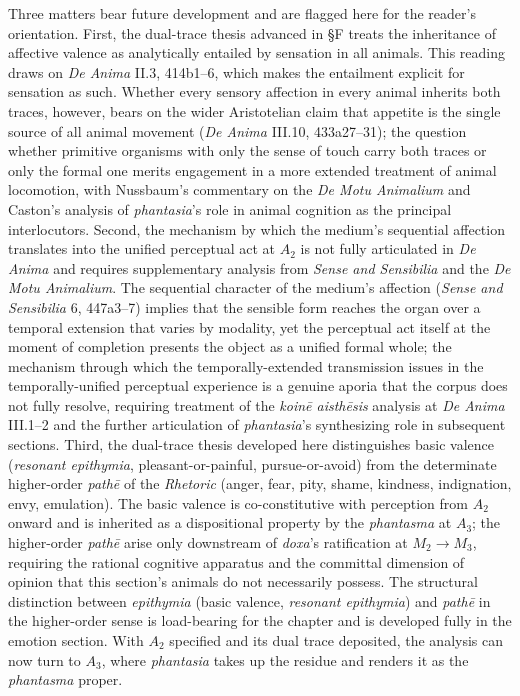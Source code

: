 Three matters bear future development and are flagged here for the reader's orientation. First, the dual-trace thesis advanced in §F treats the inheritance of affective valence as analytically entailed by sensation in all animals. This reading draws on \textit{De Anima} II.3, 414b1--6, which makes the entailment explicit for sensation as such. Whether every sensory affection in every animal inherits both traces, however, bears on the wider Aristotelian claim that appetite is the single source of all animal movement (\textit{De Anima} III.10, 433a27--31); the question whether primitive organisms with only the sense of touch carry both traces or only the formal one merits engagement in a more extended treatment of animal locomotion, with Nussbaum's commentary on the \textit{De Motu Animalium} and Caston's analysis of \textit{phantasia}'s role in animal cognition as the principal interlocutors. Second, the mechanism by which the medium's sequential affection translates into the unified perceptual act at $A_2$ is not fully articulated in \textit{De Anima} and requires supplementary analysis from \textit{Sense and Sensibilia} and the \textit{De Motu Animalium}. The sequential character of the medium's affection (\textit{Sense and Sensibilia} 6, 447a3--7) implies that the sensible form reaches the organ over a temporal extension that varies by modality, yet the perceptual act itself at the moment of completion presents the object as a unified formal whole; the mechanism through which the temporally-extended transmission issues in the temporally-unified perceptual experience is a genuine aporia that the corpus does not fully resolve, requiring treatment of the \textit{koinē aisthēsis} analysis at \textit{De Anima} III.1--2 and the further articulation of \textit{phantasia}'s synthesizing role in subsequent sections. Third, the dual-trace thesis developed here distinguishes basic valence (\textit{resonant epithymia}, pleasant-or-painful, pursue-or-avoid) from the determinate higher-order \textit{pathē} of the \textit{Rhetoric} (anger, fear, pity, shame, kindness, indignation, envy, emulation). The basic valence is co-constitutive with perception from $A_2$ onward and is inherited as a dispositional property by the \textit{phantasma} at $A_3$; the higher-order \textit{pathē} arise only downstream of \textit{doxa}'s ratification at $M_2 \rightarrow M_3$, requiring the rational cognitive apparatus and the committal dimension of opinion that this section's animals do not necessarily possess. The structural distinction between \textit{epithymia} (basic valence, \textit{resonant epithymia}) and \textit{pathē} in the higher-order sense is load-bearing for the chapter and is developed fully in the emotion section. With $A_2$ specified and its dual trace deposited, the analysis can now turn to $A_3$, where \textit{phantasia} takes up the residue and renders it as the \textit{phantasma} proper.
